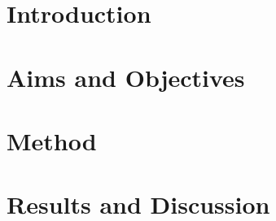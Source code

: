 \documentclass[english]{report}
\begin{document}

\tableofcontents


\begingroup
\renewcommand{\cleardoublepage}{}
\renewcommand{\clearpage}{}
\chapter{Introduction}

\endgroup

\begingroup
\renewcommand{\cleardoublepage}{}
\renewcommand{\clearpage}{}
\chapter{Aims and Objectives}

\endgroup

\begingroup
\renewcommand{\cleardoublepage}{}
\renewcommand{\clearpage}{}
\chapter{Method}

\endgroup

\begingroup
\renewcommand{\cleardoublepage}{}
\renewcommand{\clearpage}{}
\chapter{Results and Discussion}

\endgroup





\renewcommand{\bibname}{References}

\end{document}
